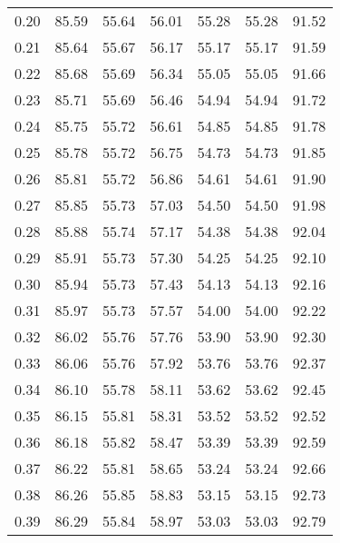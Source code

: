 \begin{tabular}{|c|c|c|c|c|c|c|}
      0.20 &     85.59 &     55.64 &      56.01 &   55.28 &      55.28 &         91.52 \\
      0.21 &     85.64 &     55.67 &      56.17 &   55.17 &      55.17 &         91.59 \\
      0.22 &     85.68 &     55.69 &      56.34 &   55.05 &      55.05 &         91.66 \\
      0.23 &     85.71 &     55.69 &      56.46 &   54.94 &      54.94 &         91.72 \\
      0.24 &     85.75 &     55.72 &      56.61 &   54.85 &      54.85 &         91.78 \\
      0.25 &     85.78 &     55.72 &      56.75 &   54.73 &      54.73 &         91.85 \\
      0.26 &     85.81 &     55.72 &      56.86 &   54.61 &      54.61 &         91.90 \\
      0.27 &     85.85 &     55.73 &      57.03 &   54.50 &      54.50 &         91.98 \\
      0.28 &     85.88 &     55.74 &      57.17 &   54.38 &      54.38 &         92.04 \\
      0.29 &     85.91 &     55.73 &      57.30 &   54.25 &      54.25 &         92.10 \\
      0.30 &     85.94 &     55.73 &      57.43 &   54.13 &      54.13 &         92.16 \\
      0.31 &     85.97 &     55.73 &      57.57 &   54.00 &      54.00 &         92.22 \\
      0.32 &     86.02 &     55.76 &      57.76 &   53.90 &      53.90 &         92.30 \\
      0.33 &     86.06 &     55.76 &      57.92 &   53.76 &      53.76 &         92.37 \\
      0.34 &     86.10 &     55.78 &      58.11 &   53.62 &      53.62 &         92.45 \\
      0.35 &     86.15 &     55.81 &      58.31 &   53.52 &      53.52 &         92.52 \\
      0.36 &     86.18 &     55.82 &      58.47 &   53.39 &      53.39 &         92.59 \\
      0.37 &     86.22 &     55.81 &      58.65 &   53.24 &      53.24 &         92.66 \\
      0.38 &     86.26 &     55.85 &      58.83 &   53.15 &      53.15 &         92.73 \\
      0.39 &     86.29 &     55.84 &      58.97 &   53.03 &      53.03 &         92.79 \\

\end{tabular}
